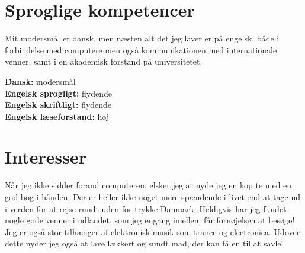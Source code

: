 \documentclass[margin,line,a4paper]{resume}
\begin{document}
\begin{resume}
\begin{description}
\end{description}

\section{\mysidestyle Sproglige kompetencer}
Mit modersmål er dansk, men næsten alt det jeg laver er på engelsk,
både i forbindelse med computere men også kommunikationen med
internationale venner, samt i en akademisk forstand på universitetet.

\textbf{Dansk:} modersmål \\
\textbf{Engelsk sprogligt:} flydende \\
\textbf{Engelsk skriftligt:} flydende \\
\textbf{Engelsk læseforstand:} høj \\

\section{\mysidestyle Interesser}

Når jeg ikke sidder forand computeren, elsker jeg at nyde jeg en kop 
te med en god bog i hånden. Der er heller ikke noget
mere spændende i livet end at tage ud i verden for at rejse rundt uden
for trykke Danmark. Heldigvis har jeg fundet nogle gode venner i udlandet, som jeg engang imellem får fornøjelsen at besøge! Jeg er også stor tilhænger af elektronisk musik som trance og electronica. Udover dette nyder jeg også at lave lækkert og sundt mad, der kan få en til at savle!


\end{resume}
\end{document}
